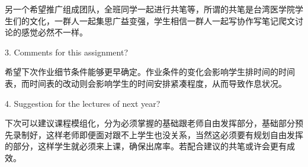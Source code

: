 另一个希望推广组成团队，全班同学一起进行共笔等，所谓的共笔是台湾医学院学生们的文化，一群人一起集思广益变强，学生相信一群人一起写协作写笔记爬文讨论的感觉必然不一样。


3. Comments for this assignment? 

希望下次作业细节条件能够更早确定。作业条件的变化会影响学生排时间的时间表，而时间表的改动则会影响学生的时间安排紧凑程度，从而导致作息状况。


4. Suggestion for the lectures of next year?

下次可以建议课程模组化，分为必须掌握的基础跟老师自由发挥部分，基础部分预先录制好，这样老师即便面对跟不上学生也没关系，当然这必须要有规划自由发挥的部分，这样学生就必须来上课，确保出席率。若配合建议的共笔或许会更有成效。


